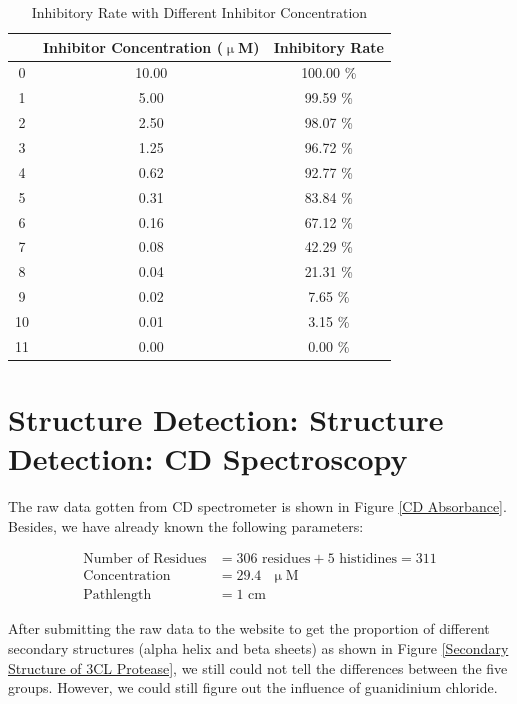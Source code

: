 \documentclass{report}
\begin{document}
\begin{table}
    \centering
    \caption{Inhibitory Rate with Different Inhibitor Concentration}

    \begin{tabular}{|c|c|c|}
        \toprule
         & Inhibitor Concentration ($\upmu$M) & Inhibitory Rate \\
        \midrule
        0 & 10.00 & 100.00 \% \\
        1 & 5.00 & 99.59 \% \\
        2 & 2.50 & 98.07 \% \\
        3 & 1.25 & 96.72 \% \\
        4 & 0.62 & 92.77 \% \\
        5 & 0.31 & 83.84 \% \\
        6 & 0.16 & 67.12 \% \\
        7 & 0.08 & 42.29 \% \\
        8 & 0.04 & 21.31 \% \\
        9 & 0.02 & 7.65 \% \\
        10 & 0.01 & 3.15 \% \\
        11 & 0.00 & 0.00 \% \\
        \bottomrule
        \end{tabular}
    \label{Inhibitory Rate with Different Inhibitor Concentration}            
        
\end{table}


\section{Structure Detection: Structure Detection: CD Spectroscopy}
The raw data gotten from CD spectrometer is shown in Figure \ref{CD Absorbance}.
Besides, we have already known the following parameters:

\begin{align}
\text{Number of Residues}&=306\text{ residues}+5\text{ histidines}=311\\
\text{Concentration}&=29.4\text{ }\upmu\text{M}\\
\text{Pathlength}&=1\text{ cm}
\end{align}


After submitting the raw data to the website to get the proportion of different secondary structures (alpha helix and beta sheets) as shown in Figure \ref{Secondary Structure of 3CL Protease}, we still could not tell the differences between the five groups.
However, we could still figure out the influence of guanidinium chloride.
\end{document}

